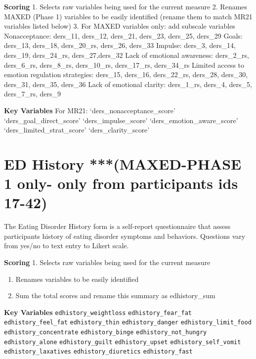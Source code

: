 \documentclass[
]{book}
\begin{document}
\textbf{Scoring} 1. Selects raw variables being used for the current measure
2. Renames MAXED (Phase 1) variables to be easily identified (rename
them to match MR21 variables listed below) 3. For MAXED variables only:
add subscale variables Nonacceptance: ders\_11, ders\_12, ders\_21,
ders\_23, ders\_25, ders\_29 Goals: ders\_13, ders\_18, ders\_20\_rs, ders\_26,
ders\_33 Impulse: ders\_3, ders\_14, ders\_19, ders\_24\_rs, ders\_27,ders\_32
Lack of emotional awareness: ders\_2\_rs, ders\_6\_rs, ders\_8\_rs,
ders\_10\_rs, ders\_17\_rs, ders\_34\_rs Limited access to emotion regulation
strategies: ders\_15, ders\_16, ders\_22\_rs, ders\_28, ders\_30, ders\_31,
ders\_35, ders\_36 Lack of emotional clarity: ders\_1\_rs, ders\_4, ders\_5,
ders\_7\_rs, ders\_9

\textbf{Key Variables} For MR21: `ders\_nonacceptance\_score'
`ders\_goal\_direct\_score' `ders\_impulse\_score' `ders\_emotion\_aware\_score'
`ders\_limited\_strat\_score' `ders\_clarity\_score'

\section{ED History ***(MAXED-PHASE 1 only- only from participants ids 17-42)}\label{ed-history-maxed-phase-1-only--only-from-participants-ids-17-42}

The Eating Disorder History form is a self-report questionnaire that
assess participants history of eating disorder symptoms and behaviors.
Questions vary from yes/no to text entry to Likert scale.

\textbf{Scoring} 1. Selects raw variables being used for the current measure

\begin{enumerate}
\def\labelenumi{\arabic{enumi}.}
\setcounter{enumi}{1}
\item
  Renames variables to be easily identified
\item
  Sum the total scores and rename this summary as edhistory\_sum
\end{enumerate}

\textbf{Key Variables} \texttt{edhistory\_weightloss} \texttt{edhistory\_fear\_fat}
\texttt{edhistory\_feel\_fat} \texttt{edhistory\_thin} \texttt{edhistory\_danger}
\texttt{edhistory\_limit\_food} \texttt{edhistory\_concentrate} \texttt{edhistory\_binge}
\texttt{edhistory\_not\_hungry} \texttt{edhistory\_alone} \texttt{edhistory\_guilt}
\texttt{edhistory\_upset} \texttt{edhistory\_self\_vomit} \texttt{edhistory\_laxatives}
\texttt{edhistory\_diuretics} \texttt{edhistory\_fast}
\end{document}
